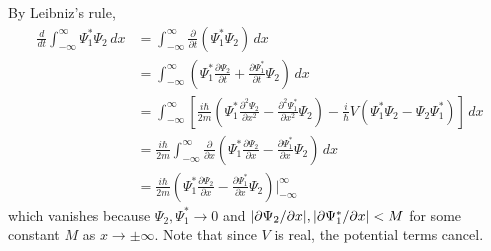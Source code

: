\documentclass[a4paper]{article}
\begin{document}

By Leibniz's rule,
\begin{align*}
	\frac{d }{d t}\int^{\infty}_{-\infty} \Psi^{*}_{1}\Psi_{2} \, dx & = \int^{\infty}_{-\infty} \frac{\partial }{\partial t}\!\left( \Psi^{*}_{1}\Psi_{2} \right) \, dx \\
									 & = \int^{\infty}_{-\infty} \!\left( \Psi^{*}_{1}\frac{\partial \Psi_{2}}{\partial t} + \frac{\partial \Psi^{*}_{1}}{\partial t}\Psi_{2} \right) \, dx \\
									 & = \int^{\infty}_{-\infty} \!\left[ \frac{i \hbar}{2m}\!\left( \Psi^{*}_{1}\frac{\partial^2 \Psi_{2}}{\partial x^2} - \frac{\partial^2 \Psi^{*}_{1}}{\partial x^2}\Psi_{2} \right) - \frac{i}{\hbar}V \!\left( \Psi^{*}_{1}\Psi_{2} - \Psi_{2}\Psi^{*}_{1} \right) \right] \, dx \\
									 & = \frac{i \hbar}{2m}\int^{\infty}_{-\infty} \frac{\partial }{\partial x}\!\left( \Psi^{*}_{1}\frac{\partial \Psi_{2}}{\partial x} - \frac{\partial \Psi^{*}_{1}}{\partial x}\Psi_{2} \right) \, dx \\
									 & = \frac{i \hbar}{2m}\!\left( \Psi^{*}_{1}\frac{\partial \Psi_{2}}{\partial x} - \frac{\partial \Psi^{*}_{1}}{\partial x}\Psi_{2} \right) \bigg|^{\infty}_{-\infty}
\end{align*}
which vanishes because \( \Psi_{2},\Psi_{1}^{*} \rightarrow 0 \) and \( \abs{\partial \Psi_{2} / \partial x}, \abs{\partial \Psi^{*}_{1} / \partial x} < M \) for some constant \( M \) as \( x \rightarrow \pm \infty \). Note that since \( V \) is real, the potential terms cancel.

\vspace{12pt}
\end{document}
